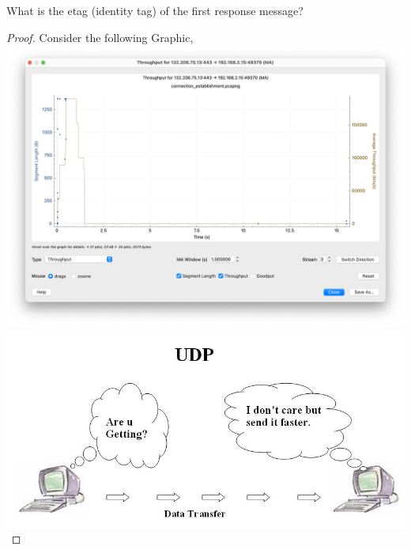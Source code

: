 \documentclass[../../main.tex]{subfiles}
\begin{document}
\begin{wts}
What is the etag (identity tag) of the first response message?
\end{wts}
\begin{proof}
Consider the following Graphic,\\
\includegraphics[width=\textwidth]{subfiles/images/throughput_Q15_server_to_client.png}
\includegraphics[width=\textwidth]{subfiles/images/L5_Manual/L5N2_ DNS & HTTP_PAGE16_8_Image111.jpg}

\end{proof}
\end{document}
